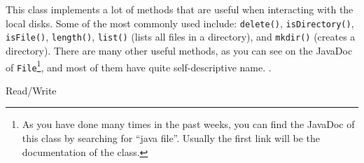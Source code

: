 This class implements a lot of methods that are useful when
interacting with the local disks. Some of the most commonly used
include: 
\verb+delete()+, 
\verb+isDirectory()+, 
\verb+isFile()+, 
\verb+length()+, 
\verb+list()+ (lists all files in a directory), 
and
\verb+mkdir()+ (creates a directory). There are many other useful
methods, as you can see on the JavaDoc of \verb+File+\footnote{As you
  have done many times in the past weeks, you can find the JavaDoc of
  this class by searching for ``java file''. Usually the first link
  will be the documentation of the class. }, and most of them have
quite self-descriptive name. . 



Read/Write

%
%

